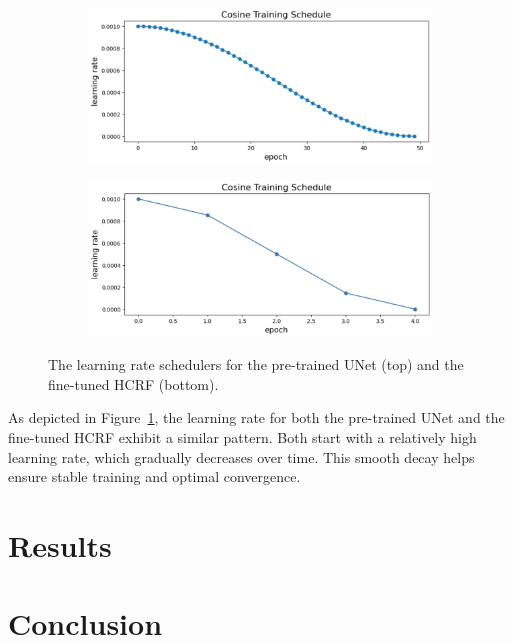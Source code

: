 \documentclass[conference]{IEEEtran}
\begin{document}
\begin{figure}[tbp]
\centering
\begin{subfigure}[b]{0.45\textwidth}
\includegraphics[width=\textwidth]{pretrain}
\end{subfigure}
\hfill
\begin{subfigure}[b]{0.45\textwidth}
\includegraphics[width=\textwidth]{finetune}
\end{subfigure}
\caption{The learning rate schedulers for the pre-trained UNet (top) and
the fine-tuned HCRF (bottom).}
\label{fig:cos}
\end{figure}


As depicted in Figure~\ref{fig:cos}, the learning rate for both the pre-trained
UNet and the fine-tuned HCRF exhibit a similar pattern. Both start with a
relatively high learning rate, which gradually decreases over time.
This smooth decay helps ensure stable training and optimal convergence.


\section{Results}


\section{Conclusion}




\end{document}
